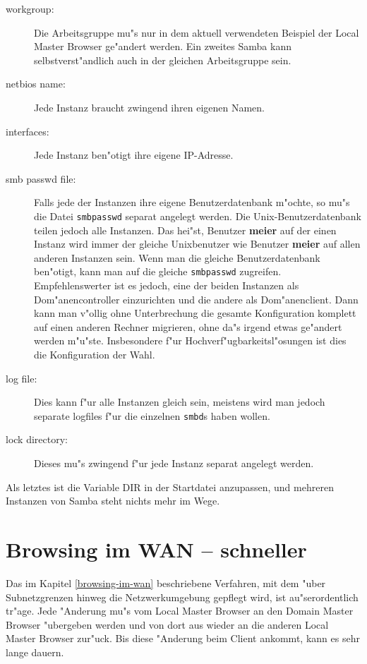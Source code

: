 \documentclass{scrartcl}\usepackage{pslatex}\typearea{12}
\newcommand{\prog}{\texttt}
\newcommand{\dateistyle}{\texttt}
\newcommand{\username}{\textbf}
\begin{document}
\begin{description}
\item[workgroup:] Die Arbeitsgruppe mu"s nur in dem aktuell
  verwendeten Beispiel der Local Master Browser ge"andert werden. Ein
  zweites Samba kann selbstverst"andlich auch in der gleichen
  Arbeitsgruppe sein.
\item[netbios name:] Jede Instanz braucht zwingend ihren eigenen
  Namen.
\item[interfaces:] Jede Instanz ben"otigt ihre eigene IP-Adresse.
\item[smb passwd file:] Falls jede der Instanzen ihre eigene
  Benutzerdatenbank m"ochte, so mu"s die Datei \dateistyle{smbpasswd}
  separat angelegt werden. Die Unix-Benutzerdatenbank teilen jedoch
  alle Instanzen. Das hei"st, Benutzer \username{meier} auf der einen
  Instanz wird immer der gleiche Unixbenutzer wie Benutzer
  \username{meier} auf allen anderen Instanzen sein.  Wenn man die
  gleiche Benutzerdatenbank ben"otigt, kann man auf die gleiche
  \dateistyle{smbpasswd} zugreifen. Empfehlenswerter ist es jedoch,
  eine der beiden Instanzen als Dom"anencontroller einzurichten und
  die andere als Dom"anenclient. Dann kann man v"ollig ohne
  Unterbrechung die gesamte Konfiguration komplett auf einen anderen
  Rechner migrieren, ohne da"s irgend etwas ge"andert werden m"u"ste.
  Insbesondere f"ur Hochverf"ugbarkeitsl"osungen ist dies die
  Konfiguration der Wahl.
\item[log file:] Dies kann f"ur alle Instanzen gleich sein, meistens
  wird man jedoch separate logfiles f"ur die einzelnen \prog{smbd}s
  haben wollen.
\item[lock directory:] Dieses mu"s zwingend f"ur jede Instanz separat
  angelegt werden.
\end{description}

Als letztes ist die Variable DIR in der Startdatei anzupassen, und
mehreren Instanzen von Samba steht nichts mehr im Wege.

\section{Browsing im WAN -- schneller}

Das im Kapitel \ref{browsing-im-wan} beschriebene Verfahren, mit dem
"uber Subnetzgrenzen hinweg die Netzwerkumgebung gepflegt wird, ist
au"serordentlich tr"age. Jede "Anderung mu"s vom Local Master Browser
an den Domain Master Browser "ubergeben werden und von dort aus wieder
an die anderen Local Master Browser zur"uck. Bis diese "Anderung beim
Client ankommt, kann es sehr lange dauern.
\end{document}
